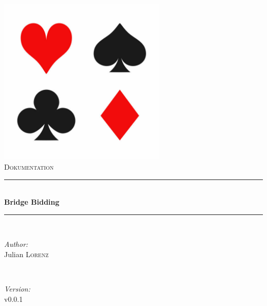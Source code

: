 \begin{titlepage}

\newcommand{\HRule}{\rule{\linewidth}{0.5mm}} %

\center %

\label{Heading}
\includegraphics[width=8cm]{pictures/logo.jpg}\\[1.5cm] %
\textsc{\Large Dokumentation}\\[0.5cm] %

\HRule \\[0.5cm]
{ \huge \bfseries Bridge Bidding}\\[0.3cm] %
\HRule \\[1.5cm]

\label{Author}
\begin{minipage}{0.4\textwidth}
\begin{flushleft} \large
\emph{Author:}\\
Julian \textsc{Lorenz}
\end{flushleft}
\end{minipage}
~
\begin{minipage}{0.4\textwidth}
\begin{flushright} \large
\emph{Version:} \\
v0.0.1
\end{flushright}
\end{minipage}\\[4cm]



\end{titlepage}
